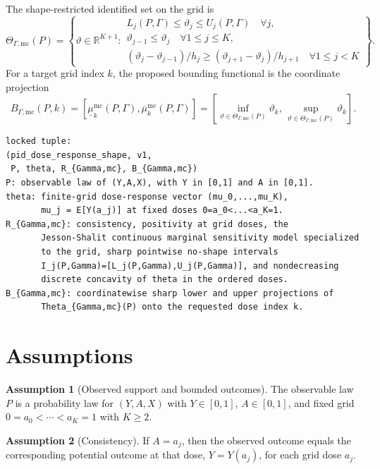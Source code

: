 \documentclass[11pt]{article}
\theoremstyle{definition}
\newtheorem{assumption}{Assumption}
\theoremstyle{plain}
\theoremstyle{remark}
\begin{document}
The shape-restricted identified set on the grid is
\[
\Theta_{\Gamma,\mathrm{mc}}(P)=
\left\{\vartheta\in\mathbb R^{K+1}:
\begin{array}{l}
L_j(P,\Gamma)\le \vartheta_j\le U_j(P,\Gamma)\quad\forall j,\\
\vartheta_{j-1}\le\vartheta_j\quad\forall 1\le j\le K,\\
(\vartheta_j-\vartheta_{j-1})/h_j\ge
(\vartheta_{j+1}-\vartheta_j)/h_{j+1}\quad\forall 1\le j<K
\end{array}
\right\}.
\]
For a target grid index \(k\), the proposed bounding functional is the coordinate projection
\[
B_{\Gamma,\mathrm{mc}}(P,k)=
\left[\underline\mu_k^{\mathrm{mc}}(P,\Gamma),
\overline\mu_k^{\mathrm{mc}}(P,\Gamma)\right]
=
\left[
\inf_{\vartheta\in\Theta_{\Gamma,\mathrm{mc}}(P)}\vartheta_k,\,
\sup_{\vartheta\in\Theta_{\Gamma,\mathrm{mc}}(P)}\vartheta_k
\right].
\]

\begin{verbatim}
locked tuple:
(pid_dose_response_shape, v1,
 P, theta, R_{Gamma,mc}, B_{Gamma,mc})
P: observable law of (Y,A,X), with Y in [0,1] and A in [0,1].
theta: finite-grid dose-response vector (mu_0,...,mu_K),
       mu_j = E[Y(a_j)] at fixed doses 0=a_0<...<a_K=1.
R_{Gamma,mc}: consistency, positivity at grid doses, the
       Jesson-Shalit continuous marginal sensitivity model specialized
       to the grid, sharp pointwise no-shape intervals
       I_j(P,Gamma)=[L_j(P,Gamma),U_j(P,Gamma)], and nondecreasing
       discrete concavity of theta in the ordered doses.
B_{Gamma,mc}: coordinatewise sharp lower and upper projections of
       Theta_{Gamma,mc}(P) onto the requested dose index k.
\end{verbatim}

\section{Assumptions}
\begin{assumption}[Observed support and bounded outcomes]\label{ass:support}
The observable law \(P\) is a probability law for \((Y,A,X)\) with \(Y\in[0,1]\), \(A\in[0,1]\), and fixed grid \(0=a_0<\cdots<a_K=1\) with \(K\ge2\).
\end{assumption}

\begin{assumption}[Consistency]\label{ass:consistency}
If \(A=a_j\), then the observed outcome equals the corresponding potential outcome at that dose, \(Y=Y(a_j)\), for each grid dose \(a_j\).
\end{assumption}
\end{document}
